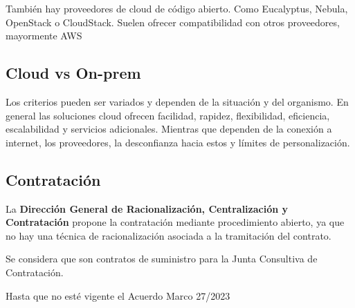     También hay proveedores de cloud de código abierto. Como Eucalyptus, Nebula, OpenStack o CloudStack. Suelen ofrecer compatibilidad con otros proveedores, mayormente AWS

\subsection{Cloud vs On-prem}

    Los criterios pueden ser variados y dependen de la situación y del organismo. En general las soluciones cloud ofrecen facilidad, rapidez, flexibilidad, eficiencia, escalabilidad y servicios adicionales. Mientras que dependen de la conexión a internet, los proveedores, la desconfianza hacia estos y límites de personalización.

\subsection{Contratación}
La \textbf{Dirección General de Racionalización, Centralización y Contratación} propone la contratación mediante procedimiento abierto, ya que no hay una técnica de racionalización asociada a la tramitación del contrato.

Se considera que son contratos de suministro para la Junta Consultiva de Contratación.

Hasta que no esté vigente el Acuerdo Marco 27/2023 %